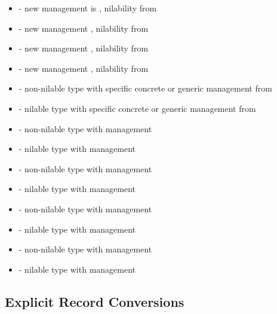 \begin{itemize}
\item
{} - new management is , nilability from 

\item
{} - new management , nilability from 

\item
{} - new management , nilability from 

\item
{} - new management , nilability from 

\item
{} - non-nilable type with specific concrete or generic management from 

\item
{} - nilable type with specific concrete or generic management from 

\item
{} - non-nilable type with  management
\item
{} - nilable type with  management

\item
{} - non-nilable type with  management
\item
{} - nilable type with  management

\item
{} - non-nilable type with  management
\item
{} - nilable type with  management

\item
{} - non-nilable type with  management
\item
{} - nilable type with  management

\end{itemize}

\subsection{Explicit Record Conversions}
\label{Explicit_Record_Conversions}

